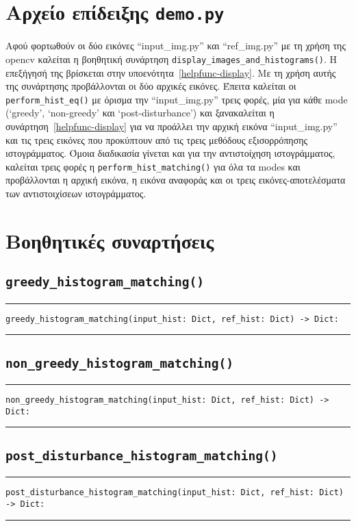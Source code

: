 \documentclass{article}
\begin{document}
\section{Αρχείο επίδειξης \texttt{demo.py}}
Αφού φορτωθούν οι δύο εικόνες ``input\_img.py'' και ``ref\_img.py'' με τη χρήση 
της opencv καλείται η βοηθητική συνάρτηση \verb|display_images_and_histograms()|.
Η επεξήγησή της βρίσκεται στην υποενότητα~\ref{helpfunc-display}. Με τη χρήση 
αυτής της συνάρτησης προβάλλονται οι δύο αρχικές εικόνες. Έπειτα καλείται οι
\verb|perform_hist_eq()| με όρισμα την ``input\_img.py'' τρεις φορές, μία
για κάθε mode (`greedy', `non-greedy' και `post-disturbance') και ξανακαλείται η
συνάρτηση~\ref{helpfunc-display} για να προάλλει την αρχική εικόνα ``input\_img.py''
και τις τρεις εικόνες που προκύπτουν από τις τρεις μεθόδους εξισορρόπησης 
ιστογράμματος. Όμοια διαδικασία γίνεται και για την αντιστοίχηση ιστογράμματος, 
καλείται τρεις φορές η \verb|perform_hist_matching()| για όλα τα modes και 
προβά\-λλονται η αρχική εικόνα, η εικόνα αναφοράς και οι τρεις εικόνες-αποτελέσματα 
των αντιστοιχίσεων ιστογράμ\-ματος.

\section{Βοηθητικές συναρτήσεις}
\subsection{\texttt{greedy\_histogram\_matching()}}\label{helpfunc-greedy}
\hrule
\vspace{1em}
\begin{verbatim}
greedy_histogram_matching(input_hist: Dict, ref_hist: Dict) -> Dict:
\end{verbatim}
\hrule
\vspace{1em}


\subsection{\texttt{non\_greedy\_histogram\_matching()}}\label{helpfunc-nongreedy}
\hrule
\vspace{1em}
\begin{verbatim}
non_greedy_histogram_matching(input_hist: Dict, ref_hist: Dict) -> Dict:
\end{verbatim}
\hrule
\vspace{1em}

\subsection{\texttt{post\_disturbance\_histogram\_matching()}}\label{helpfunc-post}
\hrule
\vspace{1em}
\begin{verbatim}
post_disturbance_histogram_matching(input_hist: Dict, ref_hist: Dict) -> Dict:
\end{verbatim}
\hrule
\vspace{1em}
\end{document}
